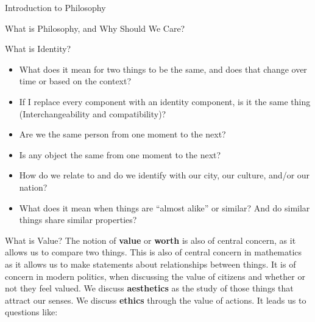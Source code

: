 \begin{chapter}{Introduction to Philosophy}
\begin{section}{What is Philosophy, and Why Should We Care?}
\begin{subsection}{What is Identity?}
            \begin{itemize}
                \item What does it mean for two things to be the same, and does that change over time or based on the context?
                \item If I replace every component with an identity component, is it the same thing (Interchangeability and compatibility)?
                \item Are we the same person from one moment to the next?
                \item Is any object the same from one moment to the next?
                \item How do we relate to and do we identify with our city, our culture, and/or our nation?
                \item What does it mean when things are “almost alike” or similar? And do similar things share similar properties?
            \end{itemize}
        \end{subsection}
        \begin{subsection}{What is Value?}
            The notion of \textbf{value} or \textbf{worth} is also of central concern, as it allows us to compare two things. This is also of central concern in mathematics as it allows us to make statements about relationships between things. It is of concern in modern politics, when discussing the value of citizens and whether or not they feel valued. We discuss \textbf{aesthetics} as the study of those things that attract our senses. We discuss \textbf{ethics} through the value of actions. It leads us to questions like:
                

\end{subsection}
\end{section}
\end{chapter}
